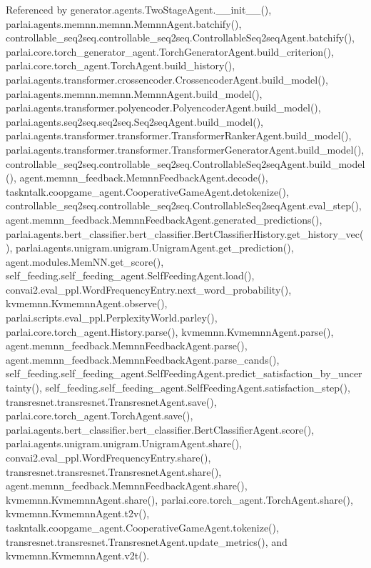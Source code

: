 Referenced by generator.\+agents.\+Two\+Stage\+Agent.\+\_\+\+\_\+init\+\_\+\+\_\+(), parlai.\+agents.\+memnn.\+memnn.\+Memnn\+Agent.\+batchify(), controllable\+\_\+seq2seq.\+controllable\+\_\+seq2seq.\+Controllable\+Seq2seq\+Agent.\+batchify(), parlai.\+core.\+torch\+\_\+generator\+\_\+agent.\+Torch\+Generator\+Agent.\+build\+\_\+criterion(), parlai.\+core.\+torch\+\_\+agent.\+Torch\+Agent.\+build\+\_\+history(), parlai.\+agents.\+transformer.\+crossencoder.\+Crossencoder\+Agent.\+build\+\_\+model(), parlai.\+agents.\+memnn.\+memnn.\+Memnn\+Agent.\+build\+\_\+model(), parlai.\+agents.\+transformer.\+polyencoder.\+Polyencoder\+Agent.\+build\+\_\+model(), parlai.\+agents.\+seq2seq.\+seq2seq.\+Seq2seq\+Agent.\+build\+\_\+model(), parlai.\+agents.\+transformer.\+transformer.\+Transformer\+Ranker\+Agent.\+build\+\_\+model(), parlai.\+agents.\+transformer.\+transformer.\+Transformer\+Generator\+Agent.\+build\+\_\+model(), controllable\+\_\+seq2seq.\+controllable\+\_\+seq2seq.\+Controllable\+Seq2seq\+Agent.\+build\+\_\+model(), agent.\+memnn\+\_\+feedback.\+Memnn\+Feedback\+Agent.\+decode(), taskntalk.\+coopgame\+\_\+agent.\+Cooperative\+Game\+Agent.\+detokenize(), controllable\+\_\+seq2seq.\+controllable\+\_\+seq2seq.\+Controllable\+Seq2seq\+Agent.\+eval\+\_\+step(), agent.\+memnn\+\_\+feedback.\+Memnn\+Feedback\+Agent.\+generated\+\_\+predictions(), parlai.\+agents.\+bert\+\_\+classifier.\+bert\+\_\+classifier.\+Bert\+Classifier\+History.\+get\+\_\+history\+\_\+vec(), parlai.\+agents.\+unigram.\+unigram.\+Unigram\+Agent.\+get\+\_\+prediction(), agent.\+modules.\+Mem\+N\+N.\+get\+\_\+score(), self\+\_\+feeding.\+self\+\_\+feeding\+\_\+agent.\+Self\+Feeding\+Agent.\+load(), convai2.\+eval\+\_\+ppl.\+Word\+Frequency\+Entry.\+next\+\_\+word\+\_\+probability(), kvmemnn.\+Kvmemnn\+Agent.\+observe(), parlai.\+scripts.\+eval\+\_\+ppl.\+Perplexity\+World.\+parley(), parlai.\+core.\+torch\+\_\+agent.\+History.\+parse(), kvmemnn.\+Kvmemnn\+Agent.\+parse(), agent.\+memnn\+\_\+feedback.\+Memnn\+Feedback\+Agent.\+parse(), agent.\+memnn\+\_\+feedback.\+Memnn\+Feedback\+Agent.\+parse\+\_\+cands(), self\+\_\+feeding.\+self\+\_\+feeding\+\_\+agent.\+Self\+Feeding\+Agent.\+predict\+\_\+satisfaction\+\_\+by\+\_\+uncertainty(), self\+\_\+feeding.\+self\+\_\+feeding\+\_\+agent.\+Self\+Feeding\+Agent.\+satisfaction\+\_\+step(), transresnet.\+transresnet.\+Transresnet\+Agent.\+save(), parlai.\+core.\+torch\+\_\+agent.\+Torch\+Agent.\+save(), parlai.\+agents.\+bert\+\_\+classifier.\+bert\+\_\+classifier.\+Bert\+Classifier\+Agent.\+score(), parlai.\+agents.\+unigram.\+unigram.\+Unigram\+Agent.\+share(), convai2.\+eval\+\_\+ppl.\+Word\+Frequency\+Entry.\+share(), transresnet.\+transresnet.\+Transresnet\+Agent.\+share(), agent.\+memnn\+\_\+feedback.\+Memnn\+Feedback\+Agent.\+share(), kvmemnn.\+Kvmemnn\+Agent.\+share(), parlai.\+core.\+torch\+\_\+agent.\+Torch\+Agent.\+share(), kvmemnn.\+Kvmemnn\+Agent.\+t2v(), taskntalk.\+coopgame\+\_\+agent.\+Cooperative\+Game\+Agent.\+tokenize(), transresnet.\+transresnet.\+Transresnet\+Agent.\+update\+\_\+metrics(), and kvmemnn.\+Kvmemnn\+Agent.\+v2t().

